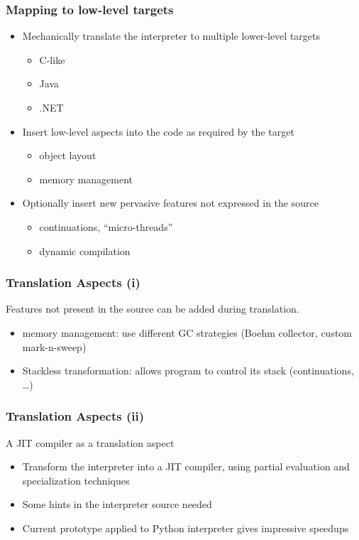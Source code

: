 \documentclass[utf8]{beamer}
\begin{document}
\begin{frame}
  \frametitle{Mapping to low-level targets}
  \begin{itemize}
  \item
    Mechanically translate the interpreter to multiple
    lower-level targets
    \begin{itemize}
    \item C-like
    \item Java
    \item .NET
    \end{itemize}
  \item
    Insert low-level aspects into the code as required by
    the target
    \begin{itemize}
    \item object layout
    \item memory management
    \end{itemize}  \item
    Optionally insert new pervasive features not expressed
    in the source
    \begin{itemize}
    \item continuations, ``micro-threads''
    \item dynamic compilation
    \end{itemize}
  \end{itemize}
\end{frame}



\begin{frame}
  \frametitle{Translation Aspects (i)}
  Features not present in the source can be added during translation.
  \begin{itemize}
  \item
    \alert{memory management}: use different GC strategies (Boehm collector, custom mark-n-sweep)
  \item
    \alert{Stackless transformation}: allows program to control its stack (continuations, \dots)
  \end{itemize}
\end{frame}


\begin{frame}
  \frametitle{Translation Aspects (ii)}
  A \alert{JIT compiler} as a translation aspect
  \begin{itemize}
  \item
    Transform the interpreter into a JIT compiler, using partial evaluation and
    specialization techniques
  \item
    Some hints in the interpreter source needed
  \item
    Current prototype applied to Python interpreter gives impressive speedups
  \end{itemize}
\end{frame}
\end{document}
